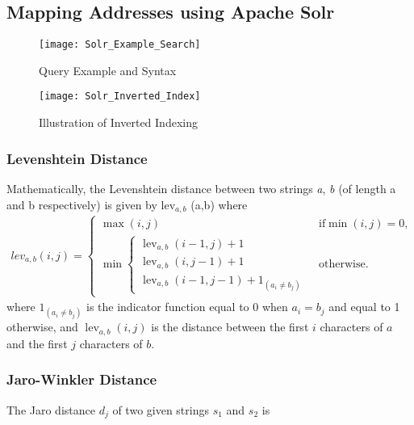 \subsection{Mapping Addresses using Apache Solr}


\begin{figure}[h!]
	\texttt{[image: Solr\_Example\_Search]}
	\caption[Query Example and Syntax]
	{Query Example and Syntax}
	\label{fig:Solr_Example_Search}
\end{figure}

\begin{figure}[h!]
	\texttt{[image: Solr\_Inverted\_Index]}
	\caption[Illustration of Inverted Indexing]
	{Illustration of Inverted Indexing}
	\label{fig:Solr_Inverted_Index}
\end{figure}

\subsubsection{Levenshtein Distance}
Mathematically, the Levenshtein distance between two strings \textit{a}, \textit{b} (of length \text{\textbar}a\text{\textbar} and \text{\textbar}b\text{\textbar} respectively) is given by lev$_{a,b}$ (\text{\textbar}a\text{\textbar},\text{\textbar}b\text{\textbar}) where
\begin{align}
	lev_{a,b}(i,j) = 
	\begin{cases}
		\max(i,j) & \text{ if} \min(i,j)=0, \\
		\min \begin{cases}
			\operatorname{lev}_{a,b}(i-1,j) + 1 \\
			\operatorname{lev}_{a,b}(i,j-1) + 1 \\
			\operatorname{lev}_{a,b}(i-1,j-1) + 1_{(a_i \neq b_j)}
		\end{cases} & \text{ otherwise.}
	\end{cases}
\end{align}
where $1_{(a_i \neq b_j)}$ is the indicator function equal to $0$ when $a_i = b_j$ and equal to 1 otherwise, and $\operatorname{lev}_{a,b}(i,j)$ is the distance between the first $i$ characters of $a$ and the first $j$ characters of $b$.

\subsubsection{Jaro-Winkler Distance}
The Jaro distance $d_j$ of two given strings $s_1$ and $s_2$ is
 
